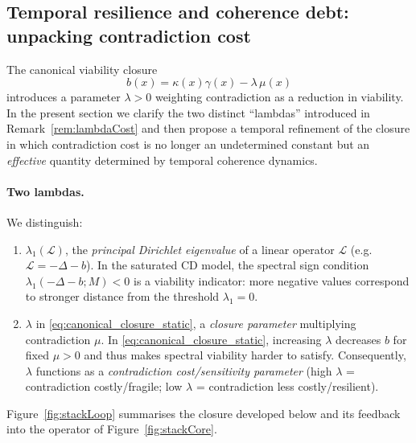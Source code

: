\documentclass[11pt]{article}
\theoremstyle{plain}
\theoremstyle{definition}
\theoremstyle{remark}
\begin{document}
\subsection{Temporal resilience and coherence debt: unpacking contradiction cost}\label{sec:temporal_resilience_debt}

The canonical viability closure
\begin{equation}\label{eq:canonical_closure_static}
b(x)=\kappa(x)\gamma(x)-\lambda\,\mu(x)
\end{equation}
introduces a parameter $\lambda>0$ weighting contradiction as a reduction in viability.
In the present section we clarify the two distinct ``lambdas'' introduced in Remark~\ref{rem:lambdaCost} and then propose a temporal refinement of the closure in which contradiction cost is no longer an undetermined constant but an \emph{effective} quantity determined by temporal coherence dynamics.

\paragraph{Two lambdas.}
We distinguish:
\begin{enumerate}
\item $\lambda_1(\mathcal{L})$, the \emph{principal Dirichlet eigenvalue} of a linear operator $\mathcal{L}$ (e.g.\ $\mathcal{L}=-\Delta-b$). In the saturated CD model, the spectral sign condition $\lambda_1(-\Delta-b;M)<0$ is a viability indicator: more negative values correspond to stronger distance from the threshold $\lambda_1=0$.
\item $\lambda$ in \eqref{eq:canonical_closure_static}, a \emph{closure parameter} multiplying contradiction $\mu$. In \eqref{eq:canonical_closure_static}, increasing $\lambda$ decreases $b$ for fixed $\mu>0$ and thus makes spectral viability harder to satisfy. Consequently, $\lambda$ functions as a \emph{contradiction cost/sensitivity parameter} (high $\lambda$ = contradiction costly/fragile; low $\lambda$ = contradiction less costly/resilient).
\end{enumerate}

Figure~\ref{fig:stackLoop} summarises the closure developed below and its feedback into the operator of Figure~\ref{fig:stackCore}.
\end{document}
